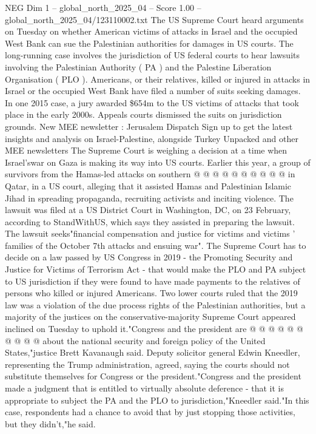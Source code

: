 \begin{textsample}{NEG Dim 1 – global\_north\_2025\_04 – Score 1.00 – global\_north\_2025\_04/123110002.txt}  \label{ex:f1_neg_041}
The US Supreme Court heard arguments on Tuesday on whether American victims of attacks in Israel and the occupied West Bank can sue the Palestinian authorities for damages in US courts.
The long-running case involves the jurisdiction of US federal courts to hear lawsuits involving the Palestinian Authority ( PA ) and the Palestine Liberation Organisation ( PLO ).
Americans, or their relatives, killed or injured in attacks in Israel or the occupied West Bank have filed a number of suits seeking damages.
In one 2015 case, a jury awarded \$654m to the US victims of attacks that took place in the early 2000s.
Appeals courts dismissed the suits on jurisdiction grounds.
New MEE newsletter : Jerusalem Dispatch Sign up to get the latest insights and analysis on Israel-Palestine, alongside Turkey Unpacked and other MEE newsletters The Supreme Court is weighing a decision at a time when Israel'swar on Gaza is making its way into US courts.
Earlier this year, a group of survivors from the Hamas-led attacks on southern @ @ @ @ @ @ @ @ @ @ in Qatar, in a US court, alleging that it assisted Hamas and Palestinian Islamic Jihad in spreading propaganda, recruiting activists and inciting violence.
The lawsuit was filed at a US District Court in Washington, DC, on 23 February, according to StandWithUS, which says they assisted in preparing the lawsuit.
The lawsuit seeks"financial compensation and justice for victims and victims ' families of the October 7th attacks and ensuing war".
The Supreme Court has to decide on a law passed by US Congress in 2019 - the Promoting Security and Justice for Victims of Terrorism Act - that would make the PLO and PA subject to US jurisdiction if they were found to have made payments to the relatives of persons who killed or injured Americans.
Two lower courts ruled that the 2019 law was a violation of the due process rights of the Palestinian authorities, but a majority of the justices on the conservative-majority Supreme Court appeared inclined on Tuesday to uphold it."Congress and the president are @ @ @ @ @ @ @ @ @ @ about the national security and foreign policy of the United States,"justice Brett Kavanaugh said.
Deputy solicitor general Edwin Kneedler, representing the Trump administration, agreed, saying the courts should not substitute themselves for Congress or the president."Congress and the president made a judgment that is entitled to virtually absolute deference - that it is appropriate to subject the PA and the PLO to jurisdiction,"Kneedler said."In this case, respondents had a chance to avoid that by just stopping those activities, but they didn't,"he said.

\end{textsample}
